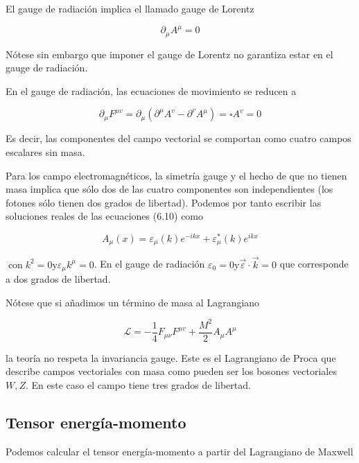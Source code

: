 El gauge de radiación implica el llamado gauge de Lorentz

\begin{equation*}
\partial_{\mu} A^{\mu}=0 \tag{6.9}
\end{equation*}




Nótese sin embargo que imponer el gauge de Lorentz no garantiza estar en el gauge de radiación.

En el gauge de radiación, las ecuaciones de movimiento se reducen a

\begin{equation*}
\partial_{\mu} F^{\mu v}=\partial_{\mu}\left(\partial^{\mu} A^{v}-\partial^{v} A^{\mu}\right)=\square A^{v}=0 \tag{6.10}
\end{equation*}


Es decir, las componentes del campo vectorial se comportan como cuatro campos escalares sin masa.

Para los campo electromagnéticos, la simetría gauge y el hecho de que no tienen masa implica que sólo dos de las cuatro componentes son independientes (los fotones sólo tienen dos grados de libertad). Podemos por tanto escribir las soluciones reales de las ecuaciones (6.10) como

\begin{equation*}
A_{\mu}(x)=\varepsilon_{\mu}(k) e^{-i k x}+\varepsilon_{\mu}^{*}(k) e^{i k x} \tag{6.11}
\end{equation*}

$\operatorname{con} k^{2}=0 \mathrm{y} \varepsilon_{\mu} k^{\mu}=0$. En el gauge de radiación $\varepsilon_{0}=0 \mathrm{y} \vec{\varepsilon} \cdot \vec{k}=0$ que corresponde a dos grados de libertad.

Nótese que si añadimos un término de masa al Lagrangiano

\begin{equation*}
\mathscr{L}=-\frac{1}{4} F_{\mu \nu} F^{\mu v}+\frac{M^{2}}{2} A_{\mu} A^{\mu} \tag{6.12}
\end{equation*}

la teoría no respeta la invariancia gauge. Este es el Lagrangiano de Proca que describe campos vectoriales con masa como pueden ser los bosones vectoriales $W, Z$. En este caso el campo tiene tres grados de libertad.
\subsection{Tensor energía-momento}
Podemos calcular el tensor energía-momento a partir del Lagrangiano de Maxwell


